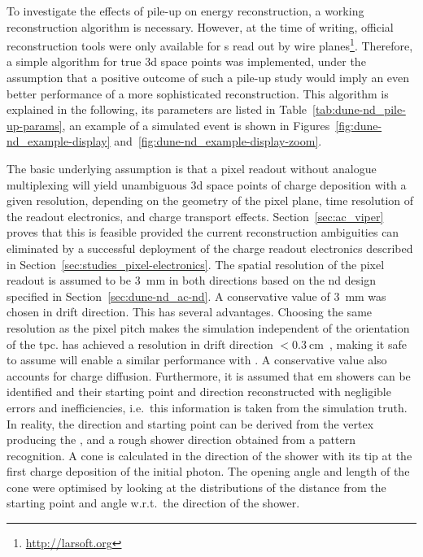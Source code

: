 To investigate the effects of pile-up on energy reconstruction, a working reconstruction algorithm is necessary.
However, at the time of writing, official reconstruction tools were only available for \lartpc{}s read out by wire planes\footnote{\url{http://larsoft.org}}.
Therefore, a simple algorithm for true \gls{3d} space points was implemented, under the assumption that a positive outcome of such a pile-up study would imply an even better performance of a more sophisticated reconstruction.
This algorithm is explained in the following, its parameters are listed in Table~\ref{tab:dune-nd_pile-up-params}, an example of a simulated event is shown in Figures~\ref{fig:dune-nd_example-display} and~\ref{fig:dune-nd_example-display-zoom}.

The basic underlying assumption is that a pixel readout without analogue multiplexing will yield unambiguous \gls{3d} space points of charge deposition with a given resolution, depending on the geometry of the pixel plane, time resolution of the readout electronics, and charge transport effects.
Section~\ref{sec:ac_viper} proves that this is feasible provided the current reconstruction ambiguities can eliminated by a successful deployment of the \larpix{} charge readout electronics described in Section~\ref{sec:studies_pixel-electronics}.
The spatial resolution of the pixel readout is assumed to be \SI{3}{\milli\metre} in both directions based on the \gls{nd} design specified in Section~\ref{sec:dune-nd_ac-nd}.
A conservative value of \SI{3}{\milli\meter} was chosen in drift direction.
This has several advantages.
Choosing the same resolution as the pixel pitch makes the simulation independent of the orientation of the \gls{tpc}.
\uboone{} has achieved a resolution in drift direction $< \SI{0.3}{\centi\metre}$~\cite{uboone}, making it safe to assume \larpix{} will enable a similar performance with \AC{}.
A conservative value also accounts for charge diffusion.
Furthermore, it is assumed that \gls{em} showers can be identified and their starting point and direction reconstructed with negligible errors and inefficiencies, i.e.\ this information is taken from the simulation truth.
In reality, the direction and starting point can be derived from the vertex producing the \Pgpz, and a rough shower direction obtained from a pattern recognition.
A cone is calculated in the direction of the shower with its tip at the first charge deposition of the initial photon.
The opening angle and length of the cone were optimised by looking at the distributions of the distance from the starting point and angle w.r.t.\ the direction of the shower.
